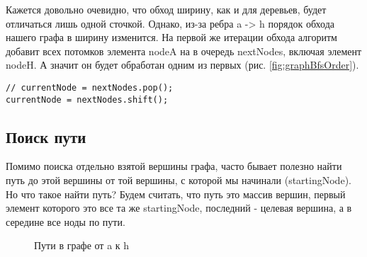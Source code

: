 \documentclass[../article.tex]{subfiles}
\begin{document}
Кажется довольно очевидно, что обход ширину, как и для деревьев, будет отличаться лишь одной сточкой. Однако, из-за ребра {\firacodebold a -> h} порядок обхода нашего графа в ширину изменится. На первой же итерации обхода алгоритм добавит всех потомков элемента {\firacodebold nodeA} на в очередь {\firacodebold nextNodes}, включая элемент {\firacodebold nodeH}. А значит он будет обработан одним из первых (рис. \ref{fig:graphBfsOrder}).

\begin{ruledelement}
    \begin{lstlisting}[caption={Отличие обхода в ширину от обхода в глубину}, label={lst:graphBfsDiff}]
// currentNode = nextNodes.pop();
currentNode = nextNodes.shift();
    \end{lstlisting}
\end{ruledelement}

\subsection{Поиск пути}

Помимо поиска отдельно взятой вершины графа, часто бывает полезно найти путь до этой вершины от той вершины, с которой мы начинали ({\firacodebold startingNode}). Но что такое найти путь? Будем считать, что путь это массив вершин, первый элемент которого это все та же {\firacodebold startingNode}, последний - целевая вершина, а в середине все ноды по пути.

\begin{figure}
    \caption{Пути в графе от {\firacodebold a} к {\firacodebold h}}
    \label{fig:pathExposure}
\end{figure}
\end{document}

